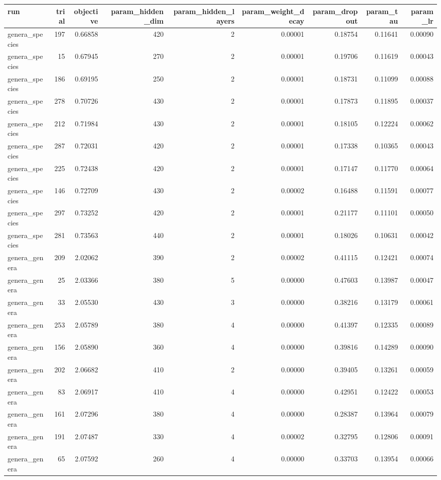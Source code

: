 \begin{tabular}{lrrrrrrrr}
\toprule
run & trial & objective & param_hidden_dim & param_hidden_layers & param_weight_decay & param_dropout & param_tau & param_lr \\
\midrule
genera_species & 197 & 0.66858 & 420 & 2 & 0.00001 & 0.18754 & 0.11641 & 0.00090 \\
genera_species & 15 & 0.67945 & 270 & 2 & 0.00001 & 0.19706 & 0.11619 & 0.00043 \\
genera_species & 186 & 0.69195 & 250 & 2 & 0.00001 & 0.18731 & 0.11099 & 0.00088 \\
genera_species & 278 & 0.70726 & 430 & 2 & 0.00001 & 0.17873 & 0.11895 & 0.00037 \\
genera_species & 212 & 0.71984 & 430 & 2 & 0.00001 & 0.18105 & 0.12224 & 0.00062 \\
genera_species & 287 & 0.72031 & 420 & 2 & 0.00001 & 0.17338 & 0.10365 & 0.00043 \\
genera_species & 225 & 0.72438 & 420 & 2 & 0.00001 & 0.17147 & 0.11770 & 0.00064 \\
genera_species & 146 & 0.72709 & 430 & 2 & 0.00002 & 0.16488 & 0.11591 & 0.00077 \\
genera_species & 297 & 0.73252 & 420 & 2 & 0.00001 & 0.21177 & 0.11101 & 0.00050 \\
genera_species & 281 & 0.73563 & 440 & 2 & 0.00001 & 0.18026 & 0.10631 & 0.00042 \\
genera_genera & 209 & 2.02062 & 390 & 2 & 0.00002 & 0.41115 & 0.12421 & 0.00074 \\
genera_genera & 25 & 2.03366 & 380 & 5 & 0.00000 & 0.47603 & 0.13987 & 0.00047 \\
genera_genera & 33 & 2.05530 & 430 & 3 & 0.00000 & 0.38216 & 0.13179 & 0.00061 \\
genera_genera & 253 & 2.05789 & 380 & 4 & 0.00000 & 0.41397 & 0.12335 & 0.00089 \\
genera_genera & 156 & 2.05890 & 360 & 4 & 0.00000 & 0.39816 & 0.14289 & 0.00090 \\
genera_genera & 202 & 2.06682 & 410 & 2 & 0.00000 & 0.39405 & 0.13261 & 0.00059 \\
genera_genera & 83 & 2.06917 & 410 & 4 & 0.00000 & 0.42951 & 0.12422 & 0.00053 \\
genera_genera & 161 & 2.07296 & 380 & 4 & 0.00000 & 0.28387 & 0.13964 & 0.00079 \\
genera_genera & 191 & 2.07487 & 330 & 4 & 0.00002 & 0.32795 & 0.12806 & 0.00091 \\
genera_genera & 65 & 2.07592 & 260 & 4 & 0.00000 & 0.33703 & 0.13954 & 0.00066 \\
\bottomrule
\end{tabular}
